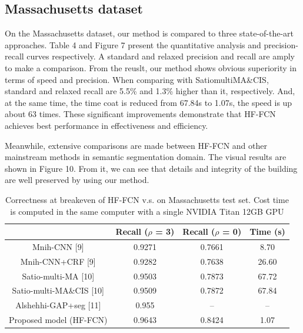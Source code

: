 \subsection{Massachusetts dataset}
On the Massachusetts dataset, our method is compared to three state-of-the-art approaches. Table 4 and Figure 7 present the quantitative analysis and precision-recall curves respectively. A standard and relaxed precision and recall are amply to make a comparison. From the reuslt, our method shows obvious superiority in terms of speed and precision. When comparing with Satio\-multi\-MA\&CIS, standard and relaxed recall are 5.5{\%} and 1.3{\%} higher than it, respectively. And, at the same time, the time coat is reduced from 67.84s to 1.07s, the speed is up about 63 times. These significant improvements demonstrate that HF-FCN achieves best performance in effectiveness and efficiency.\par
\setlength{\parindent}{2ex}Meanwhile, extensive comparisons are made between HF-FCN and other mainstream methods in semantic segmentation domain. The visual results are shown in Figure 10. From it, we can see that details and integrity of the building are well preserved by using our method.
\begin{table}
\centering
\caption {Correctness at breakeven of HF-FCN v.s. \cite{IEEEexample:mnih2013machine}\cite{IEEEexample:saito2016multiple}\cite{IEEEexample:alshehhi2017simultaneous} on Massachusetts test set. Cost time is computed in the same computer with a single NVIDIA Titan 12GB GPU}
\begin{tabular}{cccc}
\hline
&Recall ($\rho$ = 3)&Recall ($\rho$ = 0)&Time (s)\\
\hline
Mnih-CNN [9]&0.9271&0.7661&8.70\\
Mnih-CNN+CRF [9]&0.9282&0.7638&26.60\\
Satio-multi-MA [10]&0.9503&0.7873&67.72\\
Satio-multi-MA\&CIS [10]&0.9509&0.7872&67.84\\
Alshehhi-GAP+seg [11]&0.955&{--}&{--} \\
Proposed model (HF-FCN)&0.9643&0.8424&1.07\\ \hline
\end{tabular}
\end{table}

